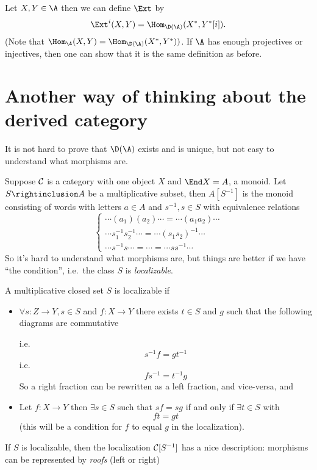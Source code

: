 \documentclass[etingof-dmod.tex]{subfiles}
\begin{document}
Let $X,Y \in \A$ then we can define $\Ext$ by $$\Ext^i(X,Y) =
\Hom_{\D(\A)}(X^*,Y^*[i]).$$
(Note that $\Hom_{\A}(X,Y) = \Hom_{\D(\A)}(X^*,Y^*))$. If $\A$ has enough
projectives or injectives, then one can show that it is the same definition as
before.

\section{Another way of thinking about the derived category}
It is not hard to prove that $\D(\A)$ exists and is unique, but not easy to
understand what morphisms are.

\begin{ex}
  Suppose $\mathcal{C}$ is a category with one object $X$ and $\End X = A$, a monoid.
  Let $S \rightinclusion A$ be a multiplicative subset, then $A[S^{-1}]$ is the
  monoid consisting of words with letters $a \in A$ and $s^{-1}, s \in S$ with
  equivalence relations $$\begin{cases} \cdots (a_1) (a_2) \cdots = \cdots
    (a_1a_2) \cdots \\
    \cdots s_1^{-1}s_2^{-1} \cdots = \cdots (s_1 s_2)^{-1} \cdots \\
  \cdots s^{-1} s \cdots = \cdots = \cdots s s^{-1} \cdots \end{cases}$$
  So it's hard to understand what morphisms are, but things are better if we
  have ``the condition'', i.e.\ the class $S$ is \textit{localizable}.
\end{ex}

\begin{defn}
  A multiplicative closed set $S$ is localizable if
  \begin{itemize}
    \item $\forall s: Z \rightarrow Y,
  s \in S$ and $f: X \rightarrow Y$ there exists $t \in S$ and $g$ such that the
  following diagrams are commutative

   i.e.\ $$s^{-1}f = g t^{-1}$$
   i.e.\ $$f s^{-1} = t^{-1} g$$
  So a right fraction can be rewritten as a left fraction, and vice-versa, and
\item  Let $f: X \rightarrow Y$ then $\exists s \in S$ such that $s f = s g $
  if and only if $\exists t \in S$ with $$f t = gt$$ (this will be a condition
  for $f$ to equal $g$ in the localization).
  \end{itemize}
\end{defn}

If $S$ is localizable, then the localization $\mathcal{C}[S^{-1}]$ has a nice
description: morphisms can be represented by \textit{roofs} (left or right)
\end{document}
